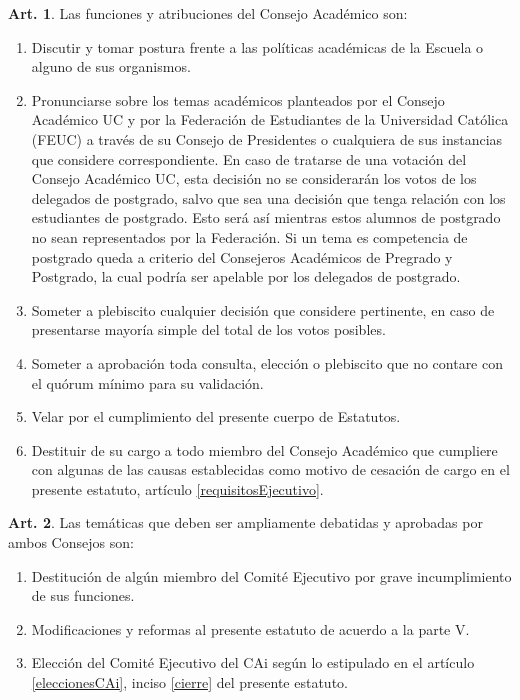 \documentclass[letterpaper,11pt]{article}
\theoremstyle{definition}%
\newtheorem{art}{Art.} %
\begin{document}
\begin{art}\label{funcionesConsejoAcademico}
	Las funciones y atribuciones del Consejo Académico son:
	\begin{enumerate}
		\item Discutir y tomar postura frente a las políticas académicas de la Escuela o alguno de sus organismos.
		\item Pronunciarse sobre los temas académicos planteados por el Consejo Académico UC y por la Federación de Estudiantes de la Universidad Católica (FEUC) a través de su Consejo de Presidentes o cualquiera de sus instancias que considere correspondiente. En caso de tratarse de
		      una votación del Consejo Académico UC, esta decisión no se considerarán los votos de los delegados de postgrado, salvo que sea una decisión que tenga relación con los estudiantes de postgrado. Esto será así mientras estos alumnos de postgrado no sean representados por la Federación. Si un tema es competencia de postgrado queda a criterio del Consejeros Académicos de Pregrado y Postgrado, la cual podría ser apelable por los delegados de postgrado.
		\item Someter a plebiscito cualquier decisión que considere pertinente, en caso de presentarse mayoría simple del total de los votos posibles.
		\item Someter a aprobación toda consulta, elección o plebiscito que no contare con el quórum mínimo para su validación.
		\item Velar por el cumplimiento del presente cuerpo de Estatutos.
		\item Destituir de su cargo a todo miembro del Consejo Académico que cumpliere con algunas de las causas establecidas como motivo de cesación de cargo en el presente estatuto, artículo \ref{requisitosEjecutivo}.
	\end{enumerate}
\end{art}

\begin{art}
	Las temáticas que deben ser ampliamente debatidas y aprobadas por ambos Consejos son:
	\begin{enumerate}
		\item Destitución de algún miembro del Comité Ejecutivo por grave incumplimiento de sus funciones.
		\item Modificaciones y reformas al presente estatuto de acuerdo a la parte V.
		\item Elección del Comité Ejecutivo del CAi según lo estipulado en el artículo \ref{eleccionesCAi}, inciso \ref{cierre} del presente estatuto.
	\end{enumerate}
\end{art}
\end{document}
